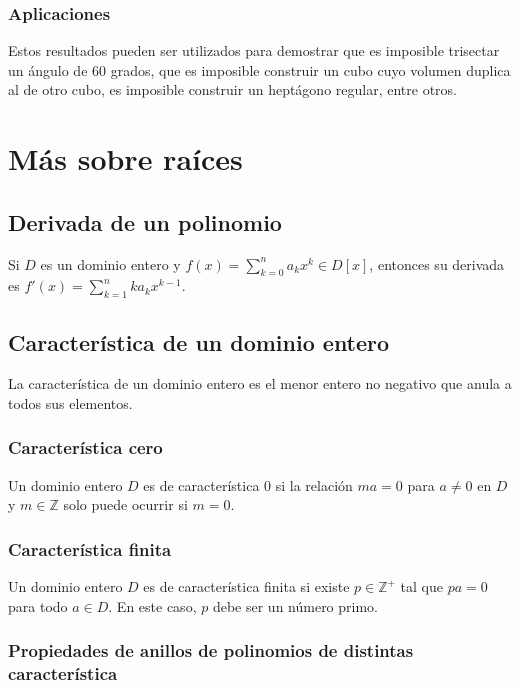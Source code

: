 \documentclass{article}
\begin{document}
\subsubsection*{\color{teal} Aplicaciones}

Estos resultados pueden ser utilizados para demostrar que es imposible trisectar un ángulo de 60 grados, que es imposible construir un cubo cuyo volumen duplica al de otro cubo, es imposible construir un heptágono regular, entre otros.

\newpage
\section{Más sobre raíces}

\subsection*{\color{violet} Derivada de un polinomio}

Si $D$ es un dominio entero y $f(x)=\displaystyle\sum_{k=0}^n a_kx^k\in D[x]$, entonces su derivada es $f'(x)=\displaystyle\sum_{k=1}^n ka_kx^{k-1}$.

\subsection*{\color{violet} Característica de un dominio entero}

La característica de un dominio entero es el menor entero no negativo que anula a todos sus elementos.

\subsubsection*{\color{teal} Característica cero}

Un dominio entero $D$ es de característica 0 si la relación $ma=0$ para $a\neq 0$ en $D$ y $m\in\mathbb{Z}$ solo puede ocurrir si $m=0$.

\subsubsection*{\color{teal} Característica finita}

Un dominio entero $D$ es de característica finita si existe $p\in\mathbb{Z}^{+}$ tal que $pa=0$ para todo $a\in D$. En este caso, $p$ debe ser un número primo.

\subsubsection*{\color{teal} Propiedades de anillos de polinomios de distintas característica}
\end{document}
